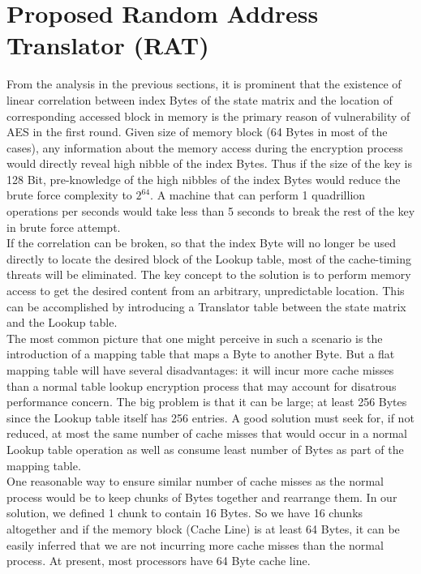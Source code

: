 \section{Proposed Random Address Translator (RAT)}

From the analysis in the previous sections, it is prominent that the existence of linear correlation between index Bytes of the state matrix and the location of corresponding accessed block in memory is the primary reason of vulnerability of AES in the first round. Given size of memory block (64 Bytes in most of the cases), any information about the memory access during the encryption process would directly reveal high nibble of the index Bytes. Thus if the size of the key is 128 Bit, pre-knowledge of the high nibbles of the index Bytes would reduce the brute force complexity to $2^{64}$. A machine that can perform 1 quadrillion operations per seconds would take less than 5 seconds to break the rest of the key in brute force attempt.\\

If the correlation can be broken, so that the index Byte will no longer be used directly to locate the desired block of the Lookup table, most of the cache-timing threats will be eliminated. The key concept to the solution is to perform memory access to get the desired content from an arbitrary, unpredictable location. This can be accomplished by introducing a Translator table between the state matrix and the Lookup table.\\

The most common picture that one might perceive in such a scenario is the introduction of a mapping table that maps a Byte to another Byte. But a flat mapping table will have several disadvantages: it will incur more cache misses than a normal table lookup encryption process that may account for disatrous performance concern. The big problem is that it can be large; at least 256 Bytes since the Lookup table itself has 256 entries. A good solution must seek for, if not reduced, at most the same number of cache misses that would occur in a normal Lookup table operation as well as consume least number of Bytes as part of the mapping table.\\

One reasonable way to ensure similar number of cache misses as the normal process would be to keep chunks of Bytes together and rearrange them. In our solution, we defined 1 chunk to contain 16 Bytes. So we have 16 chunks altogether and if the memory block (Cache Line) is at least 64 Bytes, it can be easily inferred that we are not incurring more cache misses than the normal process. At present, most processors have 64 Byte cache line.\\

